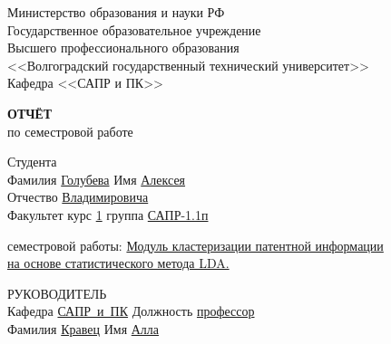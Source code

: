 \documentclass[a4paper, 14pt]{extreport}
\begin{document}
    \begin{titlepage}
        \begin{center}
            Министерство образования и науки РФ \\
            Государственное образовательное учреждение\\
            Высшего профессионального образования\\
            <<Волгоградский государственный технический университет>>\\
            Кафедра <<САПР и ПК>>
        \end{center}
        \vspace{2.0cm}
        \begin{center}
            \large \textbf{ОТЧЁТ} \\
            по семестровой работе
        \end{center}
        \begin{flushleft}
            Студента\\
            Фамилия \underline{Голубева\hspace{3.1cm}} 
            Имя \underline{Алексея\hspace{2.1cm}}\\
            Отчество \underline{Владимировича\hspace{1.6cm}}\\
            Факультет \underline{\hspace{4.8cm}} курс \underline{1\hspace{1.5cm}} 
            группа \underline{САПР-1.1п\hspace{1.9cm}}\\
        \end{flushleft}
        \vspace{1.0cm}
         семестровой работы: \underline{Модуль кластеризации патентной информации}\\
        \underline{на основе статистического метода LDA.\hspace{7.4cm}}
        \vspace{2.0cm}
        \begin{flushleft}
            РУКОВОДИТЕЛЬ\\
            Кафедра \underline{САПР~и~ПК\hspace{2.4cm}} Должность \underline{профессор\hspace{2.8cm}} \\
            Фамилия \underline{Кравец\hspace{3.3cm}} Имя \underline{Алла\hspace{5.5cm}}\\

\end{flushleft}
\end{titlepage}
\end{document}
